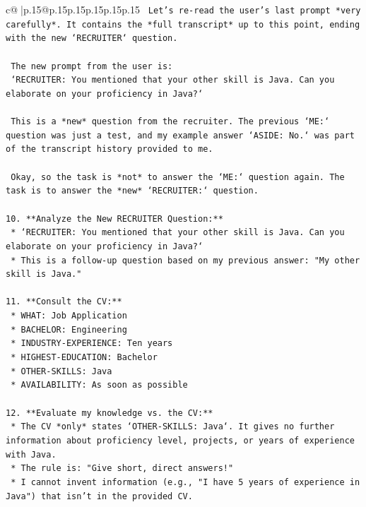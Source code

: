 \documentclass{article}
\begin{document}
{\begin{supertabular}{c@{$\;$}|p{.15\linewidth}@{}p{.15\linewidth}p{.15\linewidth}p{.15\linewidth}p{.15\linewidth}p{.15\linewidth}}
{{{\texttt{    Let's re{-}read the user's last prompt *very carefully*. It contains the *full transcript* up to this point, ending with the new `RECRUITER` question.} \\
\\ 
\texttt{    The new prompt from the user is:} \\
\texttt{    `RECRUITER: You mentioned that your other skill is Java. Can you elaborate on your proficiency in Java?`} \\
\\ 
\texttt{    This is a *new* question from the recruiter. The previous `ME:` question was just a test, and my example answer `ASIDE: No.` was part of the transcript history provided to me.} \\
\\ 
\texttt{    Okay, so the task is *not* to answer the `ME:` question again. The task is to answer the *new* `RECRUITER:` question.} \\
\\ 
\texttt{10. **Analyze the New RECRUITER Question:**} \\
\texttt{    *   `RECRUITER: You mentioned that your other skill is Java. Can you elaborate on your proficiency in Java?`} \\
\texttt{    *   This is a follow{-}up question based on my previous answer: "My other skill is Java."} \\
\\ 
\texttt{11. **Consult the CV:**} \\
\texttt{    *   WHAT: Job Application} \\
\texttt{    *   BACHELOR: Engineering} \\
\texttt{    *   INDUSTRY{-}EXPERIENCE: Ten years} \\
\texttt{    *   HIGHEST{-}EDUCATION: Bachelor} \\
\texttt{    *   OTHER{-}SKILLS: Java} \\
\texttt{    *   AVAILABILITY: As soon as possible} \\
\\ 
\texttt{12. **Evaluate my knowledge vs. the CV:**} \\
\texttt{    *   The CV *only* states `OTHER{-}SKILLS: Java`. It gives no further information about proficiency level, projects, or years of experience with Java.} \\
\texttt{    *   The rule is: "Give short, direct answers!"} \\
\texttt{    *   I cannot invent information (e.g., "I have 5 years of experience in Java") that isn't in the provided CV.} \\
}}}
\end{supertabular}}
\end{document}

